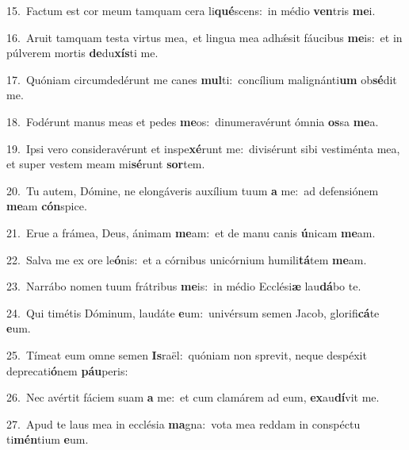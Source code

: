 {\numbfont\textcolor{\numbcolor}{15.}}~Factum est cor meum tamquam cera li\-\textbf{qué}\-scens:~\star in médio \textbf{ven}\-tris \textbf{me}\-i.\par
{\numbfont\textcolor{\numbcolor}{16.}}~Aruit tamquam testa virtus mea,~\dagger et lingua mea adhǽsit fáucibus \textbf{me}\-is:~\star et in púlverem mortis \textbf{de}\-du\-\textbf{xís}\-ti me.\par
{\numbfont\textcolor{\numbcolor}{17.}}~Quóniam circumdedérunt me canes \textbf{mul}\-ti:~\star concílium malignánti\textbf{um} ob\-\textbf{sé}\-dit me.\par
{\numbfont\textcolor{\numbcolor}{18.}}~Fodérunt manus meas et pedes \textbf{me}\-os:~\star dinumeravérunt ómnia \textbf{os}\-sa \textbf{me}\-a.\par
{\numbfont\textcolor{\numbcolor}{19.}}~Ipsi vero consideravérunt et inspe\-\textbf{xé}\-runt me:~\star divisérunt sibi vestiménta mea, et super vestem meam mi\-\textbf{sé}\-runt \textbf{sor}\-tem.\par
{\numbfont\textcolor{\numbcolor}{20.}}~Tu autem, Dómine, ne elongáveris auxílium tuum \textbf{a} me:~\star ad defensiónem \textbf{me}\-am \textbf{cón}\-spice.\par
{\numbfont\textcolor{\numbcolor}{21.}}~Erue a frámea, Deus, ánimam \textbf{me}\-am:~\star et de manu canis \textbf{ú}\-nicam \textbf{me}\-am.\par
{\numbfont\textcolor{\numbcolor}{22.}}~Salva me ex ore le\-\textbf{ó}\-nis:~\star et a córnibus unicórnium humili\-\textbf{tá}\-tem \textbf{me}\-am.\par
{\numbfont\textcolor{\numbcolor}{23.}}~Narrábo nomen tuum frátribus \textbf{me}\-is:~\star in médio Ecclési\textbf{æ} lau\-\textbf{dá}\-bo te.\par
{\numbfont\textcolor{\numbcolor}{24.}}~Qui timétis Dóminum, laudáte \textbf{e}\-um:~\star univérsum semen Jacob, glorifi\-\textbf{cá}\-te \textbf{e}\-um.\par
{\numbfont\textcolor{\numbcolor}{25.}}~Tímeat eum omne semen \textbf{Is}\-raël:~\star quóniam non sprevit, neque despéxit deprecati\-\textbf{ó}\-nem \textbf{páu}\-peris:\par
{\numbfont\textcolor{\numbcolor}{26.}}~Nec avértit fáciem suam \textbf{a} me:~\star et cum clamárem ad eum, \textbf{ex}\-au\-\textbf{dí}\-vit me.\par
{\numbfont\textcolor{\numbcolor}{27.}}~Apud te laus mea in ecclésia \textbf{ma}\-gna:~\star vota mea reddam in conspéctu ti\-\textbf{mén}\-tium \textbf{e}\-um.\par
